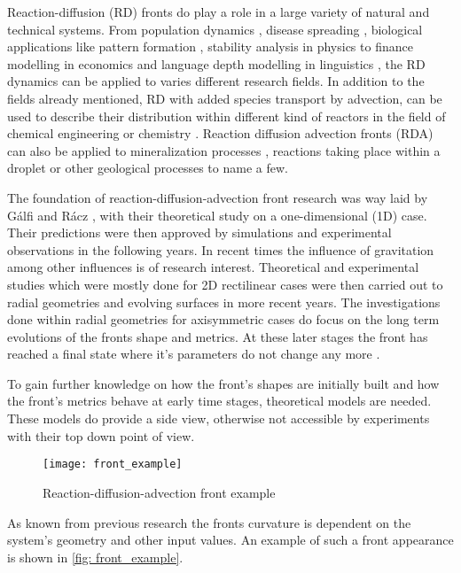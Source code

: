 \documentclass[../thesis.tex]{subfiles}
\begin{document}
Reaction-diffusion (RD) fronts do play a role in a large variety of natural and technical systems. From population dynamics \cite{chen2018hopf, wang2019persistence}, disease spreading \cite{kuto2017concentration, noble1974geographic, may1991infectious}, biological applications like pattern formation \cite{nakagaki1999reaction}, stability analysis in physics \cite{ebert2000front} to finance modelling in economics \cite{mastromatteo2014anomalous} and language depth modelling in linguistics \cite{abrams2003modelling}, the RD dynamics can be applied to varies different research fields. In addition to the fields already mentioned, RD with added species transport by advection, can be used to describe their distribution within different kind of reactors in the field of chemical engineering \cite{brau2020influence} or chemistry \cite{heidel1988pattern, von2013measurement}. Reaction diffusion advection fronts (RDA) can also be applied to mineralization processes \cite{schuszter2016calcium}, reactions taking place within a droplet \cite{tsuji2012chemical} or other geological processes \cite{al2019simulation} to name a few.

The foundation of reaction-diffusion-advection front research was way laid by G\'{a}lfi and R\'{a}cz \cite{galfi1988properties}, with their theoretical study on a one-dimensional (1D) case. Their predictions were then approved by simulations \cite{jiang1990simulation} and experimental observations \cite{koo1991space} in the following years. In recent times the influence of gravitation \cite{eckert2012} among other influences is of research interest. Theoretical and experimental studies which were mostly done for 2D rectilinear cases \cite{brau2020influence} were then carried out to radial geometries \cite{toth2020effects, comolli2021dynamics ,stergiou2022effects} and evolving surfaces \cite{kim2020pattern} in more recent years.
The investigations done within radial geometries for axisymmetric cases \cite{toth2020effects, comolli2021dynamics} do focus on the long term evolutions of the fronts shape and metrics. At these later stages the front has reached a final state where it's parameters do not change any more \cite{brau2020influence}.

To gain further knowledge on how the front's shapes are initially built and how the front's metrics behave at early time stages, theoretical models are needed. These models do provide a side view, otherwise not accessible by experiments with their top down point of view.
\begin{figure}[htbp]
	\centering
	\texttt{[image: front\_example]}
	\caption{Reaction-diffusion-advection front example}
	\label{fig: front_example}
\end{figure}
As known from previous research the fronts curvature is dependent on the system's geometry and other input values. An example of such a front appearance is shown in \autoref{fig: front_example}.
\end{document}
